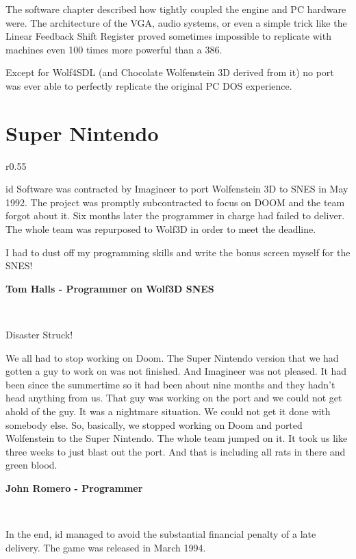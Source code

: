 \documentclass[book.tex]{subfiles}
\begin{document}
The software chapter described how tightly coupled the engine and PC hardware were. The architecture of the VGA, audio systems, or even a simple trick like the Linear Feedback Shift Register proved sometimes impossible to replicate with machines even 100 times more powerful than a 386.\\%
\par
Except for Wolf4SDL (and Chocolate Wolfenstein 3D derived from it) no port was ever able to perfectly replicate the original PC DOS experience. 


\section{Super Nintendo}
\begin{wrapfigure}[9]{r}{0.55\textwidth}
\vspace{-10pt}
\end{wrapfigure}
id Software was contracted by Imagineer to port Wolfenstein 3D to SNES in May 1992. The project was promptly subcontracted to focus on DOOM and the team forgot about it. Six months later the programmer in charge had failed to deliver. The whole team was repurposed to Wolf3D in order to meet the deadline.\\
\par
\begin{fancyquotes}
I had to dust off my programming skills and write the bonus screen myself for the SNES!\\
\par 
\textbf{Tom Halls - Programmer on Wolf3D SNES}
\end{fancyquotes}\\
\par
 \begin{fancyquotes}
Disaster Struck!\\
\par
We all had to stop working on Doom. The Super Nintendo version that we had gotten a guy to work on was not finished. And Imagineer was not pleased. It had been since the summertime so it had been about nine months and they hadn't head anything from us. That guy was working on the port and we could not get ahold of the guy. It was a nightmare situation. We could not get it done with somebody else. So, basically, we stopped working on Doom and ported Wolfenstein to the Super Nintendo. The whole team jumped on it. It took us like three weeks to just blast out the port. And that is including all rats in there and green blood.\\
\par
\textbf{John Romero - Programmer}
\end{fancyquotes}\\
\par
In the end, id managed to avoid the substantial financial penalty of a late delivery. The game was released in March 1994.\\
\end{document}
